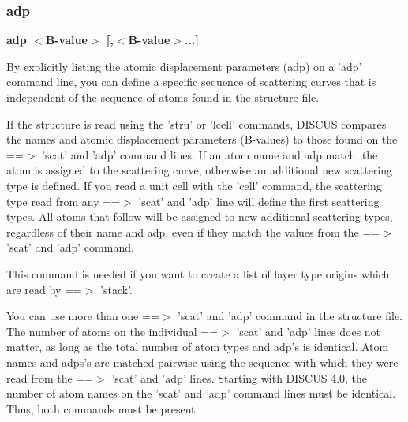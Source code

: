 \subsubsection{adp}
{\bf adp $ <$B-value$> $ [,$ <$B-value$> $...] \par }
\par
\vspace{3pt}
By explicitly listing the atomic displacement parameters (adp) on a 
'adp' command line, you can define a specific sequence of scattering 
curves that is independent of the sequence of atoms found in the 
structure file. 
\par
If the structure is read using the 'stru' or 'lcell' commands, DISCUS 
compares the names and atomic displacement parameters (B-values) to 
those found on the ==$> $ 'scat' and 'adp' command lines. If an atom name 
and adp match, the atom is assigned to the scattering curve, otherwise 
an additional new scattering type is defined. 
If you read a unit cell with the 'cell' command, the scattering type 
read from any ==$> $ 'scat' and 'adp' line will define the first 
scattering types. All atoms that follow will be assigned to new 
additional scattering types, regardless of their name and adp, even 
if they match the values from the ==$> $ 'scat' and 'adp' command. 
\par
This command is needed if you want to create a list of 
layer type origins which are read by ==$> $ 'stack'. 
\par
You can use more than one ==$> $ 'scat' and 'adp' command in the structure 
file. The number of atoms on the individual ==$> $ 'scat' and 'adp' 
lines does not matter, as long as the total number of atom types and 
adp's is identical. Atom names and adps's are matched pairwise using 
the sequence with which they were read from the ==$> $ 'scat' and 'adp' 
lines. 
Starting with DISCUS 4.0, the number of atom names on the 'scat' and 
'adp' command lines must be identical. Thus, both commands must be 
present. 
